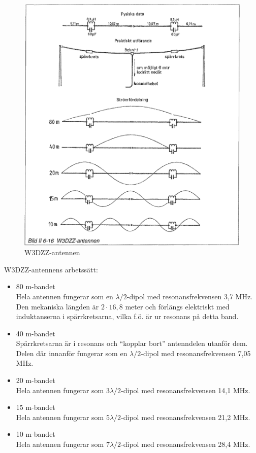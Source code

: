 \begin{figure}
  \includegraphics[width=\textwidth]{images/bild_2_6-16}
  \caption{W3DZZ-antennen}
  \label{fig:bildII6-16}
\end{figure}

W3DZZ-antennens arbetssätt:
\begin{itemize}
  \item 80 m-bandet \\ Hela antennen fungerar som en
    \(\lambda/2\)-dipol med resonansfrekvensen 3,7 MHz.  Den mekaniska
    längden är \(2 \cdot 16,8\) meter och förlängs elektriskt med
    induktanserna i spärrkretsarna, vilka f.ö. är ur resonans på detta
    band.
  \item 40 m-bandet \\ Spärrkretsarna är i resonans och ``kopplar
    bort'' antenndelen utanför dem. Delen där innanför fungerar som en
    \(\lambda/2\)-dipol med resonansfrekvensen 7,05 MHz.

  \item 20 m-bandet \\ Hela antennen fungerar som \(3\lambda/2\)-dipol
    med resonansfrekvensen 14,1 MHz.

  \item 15 m-bandet \\ Hela antennen fungerar som \(5\lambda/2\)-dipol
    med resonansfrekvensen 21,2 MHz.

  \item 10 m-bandet \\ Hela antennen fungerar som \(7\lambda/2\)-dipol
    med resonansfrekvensen 28,4 MHz.
\end{itemize}
